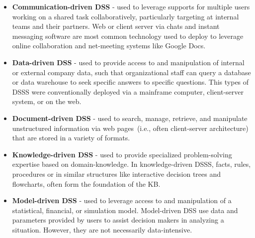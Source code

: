 \vspace{-2mm}
\begin{itemize}[noitemsep]
    \item \textbf{Communication-driven DSS} - used to leverage supports for multiple users working on a shared task collaboratively, particularly targeting at internal teams and their partners. Web or client server via chats and instant messaging software are most common technology used to deploy to leverage online collaboration and net-meeting systems like Google Docs. 
    \item \textbf{Data-driven DSS} - used to provide access to and manipulation of internal or external company data, such that organizational staff can query a database or data warehouse to seek specific answers to specific questions. This types of DSSS were conventionally deployed via a mainframe computer, client-server system, or on the web. 
    \item \textbf{Document-driven DSS} - used to search, manage, retrieve, and manipulate unstructured information via web pages~(i.e., often client-server architecture) that are stored in a variety of formats. 
    \item \textbf{Knowledge-driven DSS} - used to provide specialized problem-solving expertise based on domain-knowledge. In knowledge-driven DSSS, facts, rules, procedures or in similar structures like interactive decision trees and flowcharts, often form the foundation of the KB. 
    \item \textbf{Model-driven DSS} - used to leverage access to and manipulation of a statistical, financial, or simulation model. Model-driven DSS use data and parameters provided by users to assist decision makers in analyzing a situation. However, they are not necessarily data-intensive. 
\end{itemize}
\vspace{-2mm}



